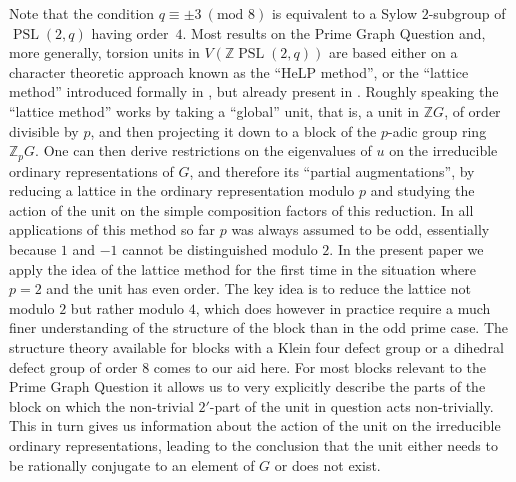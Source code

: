 \documentclass[11pt, a4paper]{amsart}
\theoremstyle{definition}
\theoremstyle{definition}
\newcommand{\PSL}{{\operatorname{PSL}}}
\begin{document}
Note that the condition $q\equiv \pm 3 \ (\textrm{mod } 8)$ is equivalent to a Sylow $2$-subgroup of $\PSL(2,q)$ having order~$4$.
Most results on the Prime Graph Question and, more generally, torsion units in $V(\mathbb{Z}\PSL(2,q))$ are based either on a character theoretic approach known as the ``HeLP method'', or the ``lattice method'' introduced formally in \cite{BachleMargolisLattice}, but already present in \cite{HertweckA6}. Roughly speaking the ``lattice method'' works by taking a ``global'' unit, that is, a unit in $\mathbb{Z}G$, of order divisible by $p$, and then projecting it down to a block of the $p$-adic group ring $\mathbb{Z}_pG$. One can then derive restrictions on the eigenvalues of $u$ on the irreducible ordinary representations of $G$, and therefore its ``partial augmentations'', by reducing a lattice in the ordinary representation modulo $p$ and studying the action of the unit on the simple composition factors of this reduction. In all applications of this method so far $p$ was always assumed to be odd, essentially because $1$ and $-1$ cannot be distinguished modulo $2$. In the present paper we apply the idea of the lattice method for the first time in the situation where $p=2$ and the unit has even order. The key idea is to reduce the lattice not modulo $2$ but rather modulo $4$, which does however in practice require a much finer understanding of the structure of the block than in the odd prime case. 
The structure theory available for blocks with a Klein four defect group or a dihedral defect group of order $8$ comes to our aid here. For most blocks relevant to the Prime Graph Question it allows us to very explicitly describe the parts of the block on which the non-trivial $2'$-part of the unit in question acts non-trivially. This in turn gives us information about the action of the unit on the irreducible ordinary representations, leading to the conclusion that the unit either needs to be rationally conjugate to an element of $G$ or does not exist. 
\end{document}
